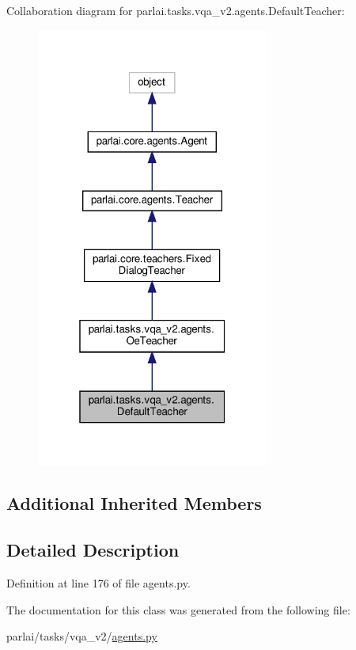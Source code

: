 Collaboration diagram for parlai.\+tasks.\+vqa\+\_\+v2.\+agents.\+Default\+Teacher\+:
\nopagebreak
\begin{figure}[H]
\begin{center}
\leavevmode
\includegraphics[width=217pt]{da/d81/classparlai_1_1tasks_1_1vqa__v2_1_1agents_1_1DefaultTeacher__coll__graph}
\end{center}
\end{figure}
\subsection*{Additional Inherited Members}


\subsection{Detailed Description}


Definition at line 176 of file agents.\+py.



The documentation for this class was generated from the following file\+:\begin{DoxyCompactItemize}
\item 
parlai/tasks/vqa\+\_\+v2/\hyperlink{parlai_2tasks_2vqa__v2_2agents_8py}{agents.\+py}\end{DoxyCompactItemize}
